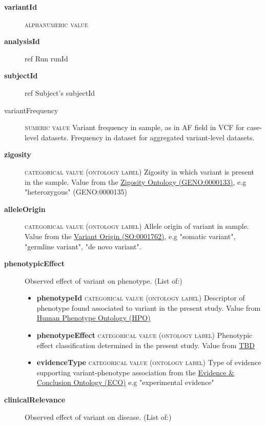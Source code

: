 \documentclass[a4paper, 10pt]{article}        %
\begin{document}
  \begin{description}
  	\item[\textbf{variantId}]  {\textsc{alphanumeric value}} 
	\item[\textbf{analysisId}] ref Run runId
	\item[\textbf{subjectId}] ref Subject's subjectId
	\item[variantFrequency] {\textsc{numeric value}} Variant frequency in sample, as in AF field in VCF for case-level datasets. Frequency in dataset for aggregated variant-level datasets.
	\item[\textbf{zigosity}] {\textsc{categorical value (ontology label)}} Zigosity in which variant is present in the sample. Value from the \href{https://github.com/monarch-initiative/GENO-ontology/}{Zigosity Ontology (GENO:0000133)}, e.g "heterozygous" (GENO:0000135)
	\item[\textbf{alleleOrigin}] {\textsc{categorical value (ontology label)}} Allele origin of variant in sample. Value from the \href{http://purl.obolibrary.org/obo/SO_0001762}{Variant Origin (SO:0001762)}, e.g "somatic variant", "germline variant", "de novo variant". %
	\item[\textbf{phenotypicEffect}] Observed effect of variant on phenotype. (List of:)
	\begin{itemize}
				\item[] \textbf{phenotypeId} {\textsc{categorical value (ontology label)}} Descriptor of phenotype found associated to variant in the present study. Value from \href{http:purl.obolibrary.org/obo/HP_0000001}{Human Phenotype Ontology (HPO)}
				\item[] \textbf{phenotypeEffect} {\textsc{categorical value (ontology label)}} Phenotypic effect classification determined in the present study. Value from \href{link}{TBD}
				\item[] \textbf{evidenceType} {\textsc{categorical value (ontology label)}} Type of evidence supporting variant-phenotype association from the \href{http://purl.obolibrary.org/obo/eco.owl}{Evidence \& Conclusion Ontology (ECO)} e.g "experimental evidence"
	\end{itemize} 
\item[\textbf{clinicalRelevance}] Observed effect of variant on disease. (List of:)

\end{description}
\end{document}
